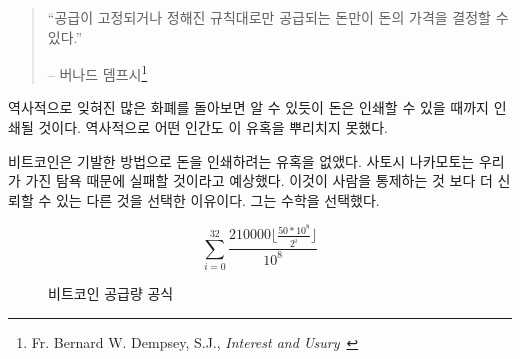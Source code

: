 \begin{quotation}\begin{samepage}
		\begin{comment}	
			\enquote{A fixed money supply, or a supply altered only in accord with
				objective and calculable criteria, is a necessary condition to a
				meaningful just price of money.}
		\end{comment}
		\enquote{공급이 고정되거나 정해진 규칙대로만 공급되는 돈만이 돈의 가격을 결정할 수 있다.}
		\begin{flushright} -- 버나드 뎀프시\footnote{Fr. Bernard W. Dempsey, S.J., \textit{Interest and Usury}~\cite[p.~210]{dempsey_interest_1943}}
\end{flushright}\end{samepage}\end{quotation}

\newpage

\begin{comment}	
	As a quick stroll through the graveyard of forgotten currencies has
	shown, money which can be printed will be printed. So far, no human in
	history was able to resist this temptation.
\end{comment}
역사적으로 잊혀진 많은 화폐를 돌아보면 알 수 있듯이 돈은 인쇄할 수 있을 때까지 인쇄될 것이다. 
역사적으로 어떤 인간도 이 유혹을 뿌리치지 못했다.

\begin{comment}	
	Bitcoin does away with the temptation to print money in an ingenious
	way. Satoshi was aware of our greed and fallibility --- this is why he
	chose something more reliable than human restraint: mathematics.
\end{comment}
비트코인은 기발한 방법으로 돈을 인쇄하려는 유혹을 없앴다. 
사토시 나카모토는 우리가 가진 탐욕 때문에 실패할 것이라고 예상했다.
이것이 사람을 통제하는 것 보다 더 신뢰할 수 있는 다른 것을 선택한 이유이다.
그는 수학을 선택했다.

\begin{figure}
	\centering
	\begin{equation}
		\sum\limits_{i=0}^{32} \frac{210000 \lfloor \frac{50*10^8}{2^i} \rfloor}{10^8}
	\end{equation}
	\caption{비트코인 공급량 공식}
	\label{fig:supply-formula-white}
\end{figure}

